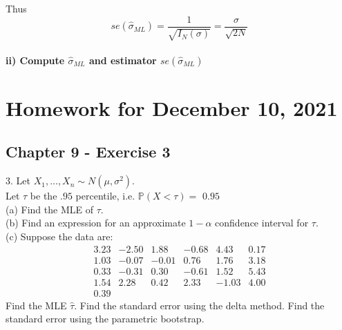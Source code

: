 \documentclass{article}
\begin{document}
Thus
\[
    se(\hat \sigma_{ML}) = \frac{1}{\sqrt{I_N (\sigma)}} = \frac{\sigma}{\sqrt{2N}}
\]

\paragraph{ii) Compute \(\hat{\sigma}_{ML}\) and estimator \(se(\hat{\sigma}_{ML})\)}

\section{Homework for December 10, 2021}
\subsection{Chapter 9 - Exercise 3}

3. Let $X_{1}, \ldots, X_{n} \sim N\left(\mu, \sigma^{2}\right)$. \\
Let $\tau$ be the $.95$ percentile, i.e. $\mathbb{P}(X<\tau)=$ $0.95$ \\
(a) Find the MLE of $\tau$. \\
(b) Find an expression for an approximate $1-\alpha$ confidence interval for $\tau$. \\
(c) Suppose the data are: \\
$$
    \begin{array}{rrrrrr}
        3.23 & -2.50 & 1.88  & -0.68 & 4.43  & 0.17 \\
        1.03 & -0.07 & -0.01 & 0.76  & 1.76  & 3.18 \\
        0.33 & -0.31 & 0.30  & -0.61 & 1.52  & 5.43 \\
        1.54 & 2.28  & 0.42  & 2.33  & -1.03 & 4.00 \\
        0.39 &       &       &       &       &
    \end{array}
$$
Find the MLE $\widehat{\tau}$. Find the standard error using the delta method. Find the standard error using the parametric bootstrap.
\end{document}
